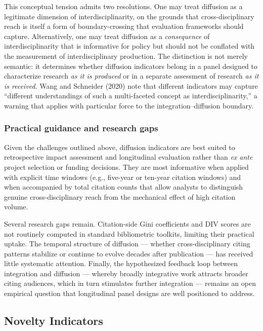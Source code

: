 \documentclass[
]{article}
\begin{document}
This conceptual tension admits two resolutions. One may treat diffusion
as a legitimate dimension of interdisciplinarity, on the grounds that
cross-disciplinary reach is itself a form of boundary-crossing that
evaluation frameworks should capture. Alternatively, one may treat
diffusion as a \emph{consequence} of interdisciplinarity that is
informative for policy but should not be conflated with the measurement
of interdisciplinary production. The distinction is not merely semantic:
it determines whether diffusion indicators belong in a panel designed to
characterize research \emph{as it is produced} or in a separate
assessment of research \emph{as it is received}. Wang and Schneider
(2020) note that different indicators may capture ``different
understandings of such a multi-faceted concept as interdisciplinarity,''
a warning that applies with particular force to the
integration--diffusion boundary.

\hypertarget{practical-guidance-and-research-gaps}{%
\subsubsection{Practical guidance and research
gaps}\label{practical-guidance-and-research-gaps}}

Given the challenges outlined above, diffusion indicators are best
suited to retrospective impact assessment and longitudinal evaluation
rather than \emph{ex ante} project selection or funding decisions. They
are most informative when applied with explicit time windows (e.g.,
five-year or ten-year citation windows) and when accompanied by total
citation counts that allow analysts to distinguish genuine
cross-disciplinary reach from the mechanical effect of high citation
volume.

Several research gaps remain. Citation-side Gini coefficients and DIV
scores are not routinely computed in standard bibliometric toolkits,
limiting their practical uptake. The temporal structure of diffusion ---
whether cross-disciplinary citing patterns stabilize or continue to
evolve decades after publication --- has received little systematic
attention. Finally, the hypothesized feedback loop between integration
and diffusion --- whereby broadly integrative work attracts broader
citing audiences, which in turn stimulates further integration ---
remains an open empirical question that longitudinal panel designs are
well positioned to address.

\hypertarget{novelty-indicators}{%
\subsection{Novelty Indicators}\label{novelty-indicators}}
\end{document}
